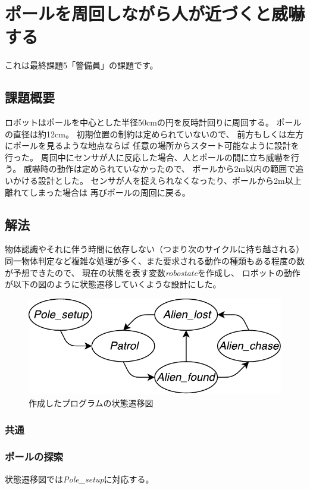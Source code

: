 \documentclass[main]{subfiles}
\begin{document}
\chapter{ポールを周回しながら人が近づくと威嚇する}

これは最終課題5「警備員」の課題です。

\section{課題概要}
ロボットはポールを中心とした半径50cmの円を反時計回りに周回する。
ポールの直径は約12cm。
初期位置の制約は定められていないので、
前方もしくは左方にポールを見るような地点ならば
任意の場所からスタート可能なように設計を行った。
周回中にセンサが人に反応した場合、人とポールの間に立ち威嚇を行う。
威嚇時の動作は定められていなかったので、
ポールから2m以内の範囲で追いかける設計とした。
センサが人を捉えられなくなったり、ポールから2m以上離れてしまった場合は
再びポールの周回に戻る。

\section{解法}
物体認識やそれに伴う時間に依存しない（つまり次のサイクルに持ち越される）
同一物体判定など複雑な処理が多く、また要求される動作の種類もある程度の数が予想できたので、
現在の状態を表す変数\textit{robostate}を作成し、
ロボットの動作が以下の図のように状態遷移していくような設計にした。
\begin{figure}[H]
	\centering
	\includegraphics{img/guard_state.pdf}
	\caption{作成したプログラムの状態遷移図}
\end{figure}

\subsection{共通}

\subsection{ポールの探索}
状態遷移図では\textit{Pole\_setup}に対応する。
\end{document}
